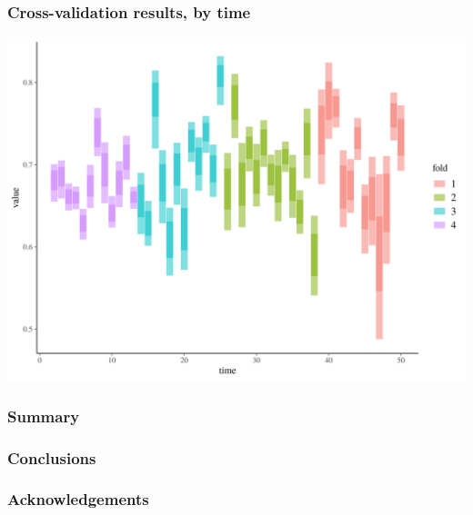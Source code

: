 \documentclass{beamer}
\begin{document}
\begin{frame}
  \frametitle{Cross-validation results, by time}

  \includegraphics[width=\textwidth,height=0.8\textheight,keepaspectratio=true]{../results/figure/fold_auc_time}

\end{frame}


\begin{frame}
  \frametitle{Summary}

\end{frame}


\begin{frame}
  \frametitle{Conclusions}

\end{frame}


\begin{frame}
  \frametitle{Acknowledgements}

\end{frame}



\appendix
\end{document}

